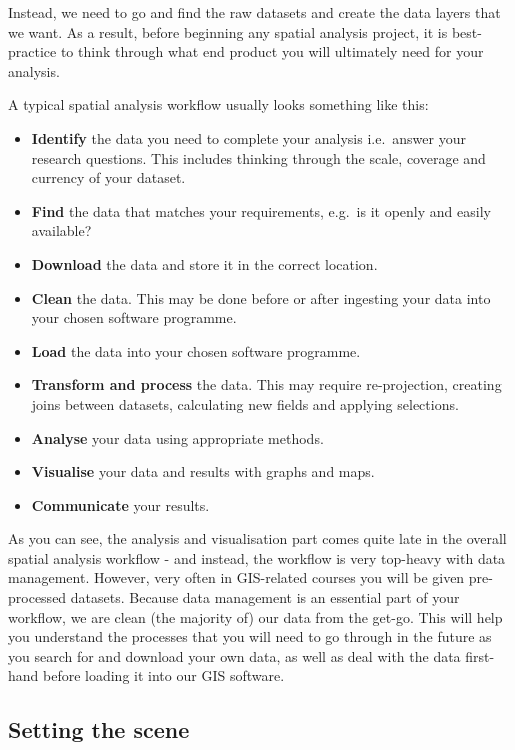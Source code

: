 \documentclass[
]{book}
\providecommand{\tightlist}{%
  \setlength{\itemsep}{0pt}\setlength{\parskip}{0pt}}
\begin{document}
Instead, we need to go and find the raw datasets and create the data layers that we want. As a result, before beginning any spatial analysis project, it is best-practice to think through what end product you will ultimately need for your analysis.

A typical spatial analysis workflow usually looks something like this:

\begin{itemize}
\tightlist
\item
  \textbf{Identify} the data you need to complete your analysis i.e.~answer your research questions. This includes thinking through the scale, coverage and currency of your dataset.
\item
  \textbf{Find} the data that matches your requirements, e.g.~is it openly and easily available?
\item
  \textbf{Download} the data and store it in the correct location.
\item
  \textbf{Clean} the data. This may be done before or after ingesting your data into your chosen software programme.
\item
  \textbf{Load} the data into your chosen software programme.
\item
  \textbf{Transform and process} the data. This may require re-projection, creating joins between datasets, calculating new fields and applying selections.
\item
  \textbf{Analyse} your data using appropriate methods.
\item
  \textbf{Visualise} your data and results with graphs and maps.
\item
  \textbf{Communicate} your results.
\end{itemize}

As you can see, the analysis and visualisation part comes quite late in the overall spatial analysis workflow - and instead, the workflow is very top-heavy with data management. However, very often in GIS-related courses you will be given pre-processed datasets. Because data management is an essential part of your workflow, we are clean (the majority of) our data from the get-go. This will help you understand the processes that you will need to go through in the future as you search for and download your own data, as well as deal with the data first-hand before loading it into our GIS software.

\hypertarget{w02-scene}{%
\subsection{Setting the scene}\label{w02-scene}}
\end{document}

